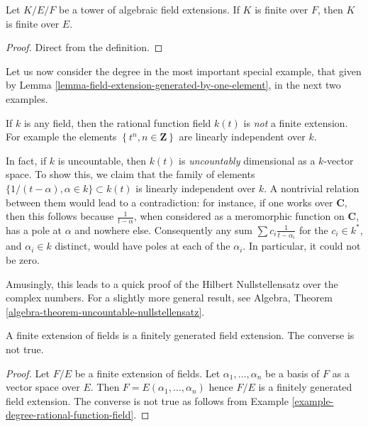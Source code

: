 \begin{lemma}
\label{lemma-finite-goes-up}
Let $K/E/F$ be a tower of algebraic field extensions.
If $K$ is finite over $F$, then $K$ is finite over $E$.
\end{lemma}

\begin{proof}
Direct from the definition.
\end{proof}

\noindent
Let us now consider the degree in the most important special example, that
given by Lemma \ref{lemma-field-extension-generated-by-one-element}, in the
next two examples.

\begin{example}
\label{example-degree-rational-function-field}
If $k$ is any field, then the rational function field $k(t)$ is
{\it not} a finite extension. For example the elements
$\left\{t^n, n \in \mathbf{Z}\right\}$ are linearly independent over $k$.

\medskip\noindent
In fact, if $k$ is uncountable, then $k(t)$ is {\it uncountably} dimensional
as a $k$-vector space. To show this, we claim that the family of elements
$\{1/(t- \alpha), \alpha \in k\} \subset k(t)$ is linearly independent over
$k$. A nontrivial relation between them would lead to a contradiction: for
instance, if one works over $\mathbf{C}$, then this follows because
$\frac{1}{t-\alpha}$, when considered as a meromorphic function on
$\mathbf{C}$, has a pole at $\alpha$ and nowhere else.
Consequently any sum $\sum c_i \frac{1}{t - \alpha_i}$ for the $c_i \in k^*$,
and $\alpha_i \in k$ distinct, would have poles at each of the $\alpha_i$.
In particular, it could not be zero.

\medskip\noindent
Amusingly, this leads to a quick proof of the Hilbert Nullstellensatz over
the complex numbers. For a slightly more general result, see
Algebra, Theorem \ref{algebra-theorem-uncountable-nullstellensatz}.
\end{example}

\begin{lemma}
\label{lemma-finite-finitely-generated}
A finite extension of fields is a finitely generated field extension.
The converse is not true.
\end{lemma}

\begin{proof}
Let $F/E$ be a finite extension of fields. Let $\alpha_1, \ldots, \alpha_n$
be a basis of $F$ as a vector space over $E$. Then
$F = E(\alpha_1, \ldots, \alpha_n)$ hence $F/E$ is a finitely generated
field extension. The converse is not true as follows from
Example \ref{example-degree-rational-function-field}.
\end{proof}


